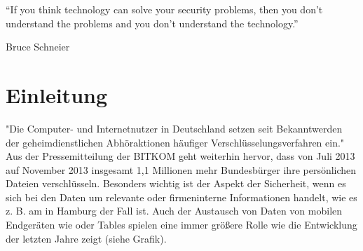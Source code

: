 \documentclass[10pt, a4paper,headsepline]{scrreprt}
\begin{document}
\pagestyle{empty}




\vspace*{\fill}
\begin{center}
“If you think technology can solve your security problems, then you don’t understand the problems and you don’t understand the technology.”
\end{center}
\begin{flushright}
Bruce Schneier
\end{flushright}
\vspace*{\fill}

\clearpage%
\begingroup
  \renewcommand*{\chapterpagestyle}{empty}
  \pagestyle{empty}
  \tableofcontents
  \listoffigures
  \clearpage
\endgroup


\fancyhead[L]{\nouppercase{\leftmark}} %

\chapter{Einleitung}
\setcounter{page}{1}
\pagestyle{fancy}
"Die Computer- und Internetnutzer in Deutschland setzen seit Bekanntwerden der geheimdienstlichen Abhöraktionen häufiger Verschlüsselungsverfahren ein." %
Aus der Pressemitteilung der BITKOM geht weiterhin hervor, dass von Juli 2013 auf November 2013 insgesamt 1,1 Millionen mehr Bundesbürger ihre persönlichen Dateien verschlüsseln. Besonders wichtig ist der Aspekt der Sicherheit, wenn es sich bei den Daten um relevante oder firmeninterne Informationen handelt, wie es z. B. am  in Hamburg der Fall ist. Auch der Austausch von Daten von mobilen Endgeräten wie  oder Tables spielen eine immer größere Rolle wie die Entwicklung der letzten Jahre zeigt (siehe Grafik). \\
\end{document}
